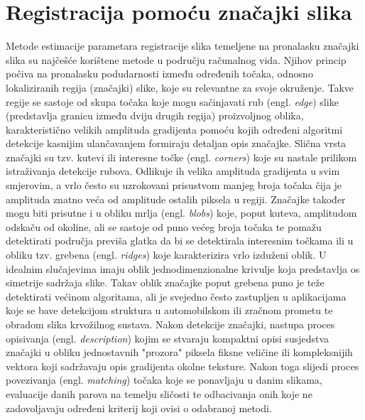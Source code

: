 \documentclass[times, utf8, diplomski]{fer}
\begin{document}
\section{Registracija pomoću značajki slika}
Metode estimacije parametara registracije slika temeljene na pronalasku značajki slika su najčešće korištene metode u području računalnog vida. Njihov princip počiva na pronalasku podudarnosti između određenih točaka, odnosno lokaliziranih regija (značajki) slike, koje su relevantne za svoje  okruženje. Takve regije se sastoje od skupa točaka koje mogu sačinjavati rub (engl. \textit{edge}) slike (predstavlja granicu između dviju drugih regija) proizvoljnog oblika, karakteristično velikih amplituda gradijenta pomoću kojih određeni algoritmi detekcije kasnijim ulančavanjem formiraju detaljan opis značajke. Slična vrsta značajki su tzv. kutevi ili interesne točke (engl. \textit{corners}) koje su nastale prilikom istraživanja detekcije rubova. Odlikuje ih velika amplituda gradijenta u svim smjerovim, a vrlo često su uzrokovani prisustvom manjeg broja točaka čija je amplituda znatno veća od amplitude ostalih piksela u regiji. Značajke također mogu biti prisutne i u obliku mrlja (engl. \textit{blobs}) koje, poput kuteva, amplitudom odskaču od okoline, ali se sastoje od puno većeg broja točaka te pomažu detektirati područja previša glatka da bi se detektirala interesnim točkama ili u obliku tzv. grebena (engl. \textit{ridges}) koje karakterizira vrlo izduženi oblik. U idealnim slučajevima imaju oblik jednodimenzionalne krivulje koja predstavlja os simetrije sadržaja slike. Takav oblik značajke poput grebena puno je teže detektirati većinom algoritama, ali je svejedno često zastupljen u aplikacijama koje se bave detekcijom struktura u automobilskom ili zračnom prometu te obradom slika krvožilnog sustava. Nakon detekcije značajki, nastupa proces opisivanja (engl. \textit{description}) kojim se stvaraju kompaktni opisi susjedstva značajki u obliku jednostavnih "prozora" piksela fiksne veličine ili kompleksnijih vektora koji sadržavaju opis gradijenta okolne teksture. Nakon toga slijedi proces povezivanja (engl. \textit{matching}) točaka koje se ponavljaju u danim slikama, evaluacije danih parova na temelju sličosti te odbacivanja onih koje ne zadovoljavaju određeni kriterij koji ovisi o odabranoj metodi. 
\end{document}
